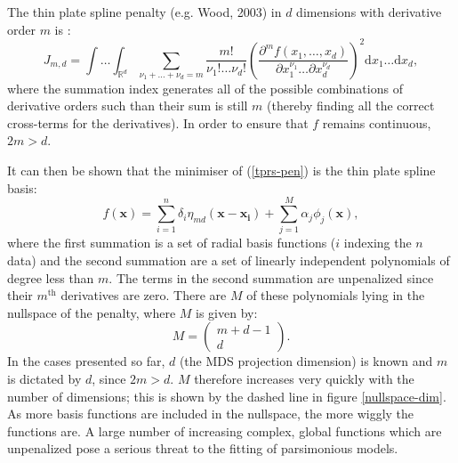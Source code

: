 \documentclass[useAMS, referee]{biom}
\begin{document}
The thin plate spline penalty (e.g. Wood, 2003) in $d$ dimensions with derivative order $m$ is :
\begin{equation}
J_{m,d} = \int \ldots \int_{\mathbb{R}^d} \sum_{\nu_1 + \dots + \nu_d=m} \frac{m!}{\nu_1! \dots \nu_d!} \left( \frac{\partial^m f \left (x_1,\dots,x_d \right )}{\partial x_1^{\nu_1} \ldots  \partial x_d^{\nu_d}} \right)^2 \text{d} x_1 \ldots  \text{d} x_d,
\label{tprs-pen}
\end{equation}
where the summation index generates all of the possible combinations of derivative orders such than their sum is still $m$ (thereby finding all the correct cross-terms for the derivatives). In order to ensure that $f$ remains continuous, $2m>d$.

It can then be shown that the minimiser of (\ref{tprs-pen}) is the thin plate spline basis:
\begin{equation}
f(\mathbf{x}) = \sum_{i=1}^n \delta_i \eta_{md}(\mathbf{x}-\mathbf{x_i}) + \sum_{j=1}^M \alpha_j \phi_j(\mathbf{x}),
\label{tprs-basis}
\end{equation}
where the first summation is a set of radial basis functions ($i$ indexing the $n$ data) and the second summation are a set of linearly independent polynomials of degree less than $m$. The terms in the second summation are unpenalized since their $m^\text{th}$ derivatives are zero. There are $M$ of these polynomials lying in the nullspace of the penalty, where $M$ is given by:
\begin{equation}
M=\begin{pmatrix} m+d-1 \\ d  \end{pmatrix}.
\label{gds-bigm}
\end{equation}
In the cases presented so far, $d$ (the MDS projection dimension) is known and $m$ is dictated by $d$, since $2m>d$. $M$ therefore increases very quickly with the number of dimensions; this is shown by the dashed line in figure \ref{nullspace-dim}. As more basis functions are included in the nullspace, the more wiggly the functions are. A large number of increasing complex, global functions which are unpenalized pose a serious threat to the fitting of parsimonious models.
\end{document}
